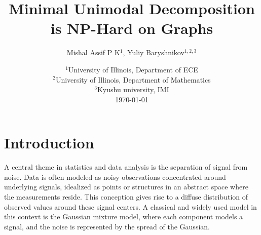 \documentclass[11pt]{article}
\begin{document}
\author{Mishal Assif P K$^1$, Yuliy Baryshnikov$^{1,2,3}$ }
\date{%
    $^1$University of Illinois, Department of ECE\\%
    $^2$University of Illinois, Department of Mathematics\\
    $^3$Kyushu university, IMI\\[2ex]%
    \today
}


\title{Minimal Unimodal Decomposition is NP-Hard on Graphs}


\maketitle


\section{Introduction}
\label{sec:intro}

A central theme in statistics and data analysis is the separation of signal from noise. Data is often modeled as noisy observations concentrated around underlying signals, idealized as points or structures in an abstract space where the measurements reside. This conception gives rise to a diffuse distribution of observed values around these signal centers. A classical and widely used model in this context is the Gaussian mixture model, where each component models a signal, and the noise is represented by the spread of the Gaussian.
\end{document}
